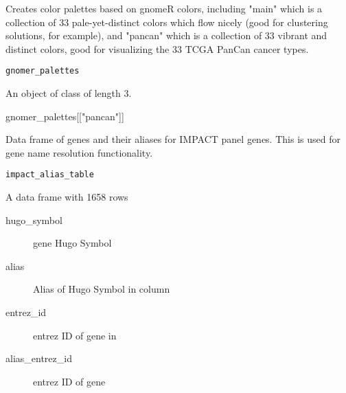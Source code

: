 \documentclass[a4paper]{book}
\begin{document}
%
\begin{Description}\relax
Creates color palettes based on gnomeR colors, including
"main" which is a collection of 33 pale-yet-distinct colors which flow nicely
(good for clustering solutions, for example), and
"pancan" which is a collection of 33 vibrant and distinct colors, good for visualizing the
33 TCGA PanCan cancer types.
\end{Description}
%
\begin{Usage}
\begin{verbatim}
gnomer_palettes
\end{verbatim}
\end{Usage}
%
\begin{Format}
An object of class  of length 3.
\end{Format}
%
\begin{Examples}
\begin{ExampleCode}
gnomer_palettes[["pancan"]]
\end{ExampleCode}
\end{Examples}
%
\begin{Description}\relax
Data frame of genes and their aliases for
IMPACT panel genes. This is used for gene name resolution functionality.
\end{Description}
%
\begin{Usage}
\begin{verbatim}
impact_alias_table
\end{verbatim}
\end{Usage}
%
\begin{Format}
A data frame with 1658 rows
\begin{description}

\item[hugo\_symbol] gene Hugo Symbol
\item[alias] Alias of Hugo Symbol in  column
\item[entrez\_id] entrez ID of gene in 
\item[alias\_entrez\_id] entrez ID of  gene

\end{description}

\end{Format}
\end{document}

